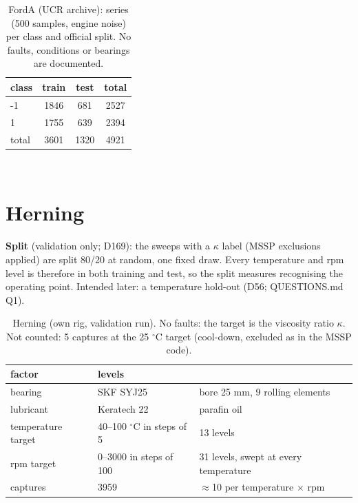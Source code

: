 \begin{table}[ht]
\centering
\footnotesize
\begin{tabular}{lccc}
\toprule
class & \cellcolor{trainc}train & \cellcolor{testc}test & total \\
\midrule
-1 & \cellcolor{trainc}1846 & \cellcolor{testc}681 & 2527 \\
1 & \cellcolor{trainc}1755 & \cellcolor{testc}639 & 2394 \\
\midrule
total & \cellcolor{trainc}3601 & \cellcolor{testc}1320 & 4921 \\
\bottomrule
\end{tabular}
\\[4pt] \splitlegend
\caption{FordA (UCR archive): series (500 samples, engine noise) per class and official split. No faults, conditions or bearings are documented.}
\end{table}

\section{Herning}
\textbf{Split} (validation only; D169): the sweeps with a $\kappa$ label (MSSP exclusions applied) are split 80/20 at random, one fixed draw. Every temperature and rpm level is therefore in both training and test, so the split measures recognising the operating point. Intended later: a temperature hold-out (D56; QUESTIONS.md Q1).

\begin{table}[ht]
\centering
\footnotesize
\begin{tabular}{lll}
\toprule
factor & levels &  \\
\midrule
bearing & SKF SYJ25 & bore 25 mm, 9 rolling elements \\
lubricant & Keratech 22 & parafin oil \\
temperature target & 40--100 $^\circ$C in steps of 5 & 13 levels \\
rpm target & 0--3000 in steps of 100 & 31 levels, swept at every temperature \\
captures & \cellcolor{bothc}3959 & $\approx$10 per temperature $\times$ rpm \\
\bottomrule
\end{tabular}
\\[4pt] \splitlegend
\caption{Herning (own rig, validation run). No faults: the target is the viscosity ratio $\kappa$. Not counted: 5 captures at the 25 $^\circ$C target (cool-down, excluded as in the MSSP code).}
\end{table}

